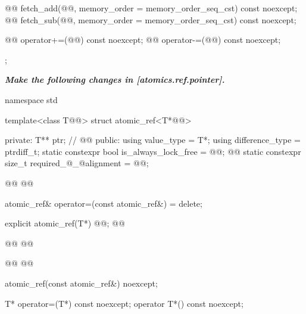 \begin{codeblock}
{{    @@ fetch_add(@@,
                             memory_order = memory_order_seq_cst) const noexcept;
    @@ fetch_sub(@@,
                             memory_order = memory_order_seq_cst) const noexcept;

    @@ operator+=(@@) const noexcept;
    @@ operator-=(@@) const noexcept;
  };
}
\end{codeblock}

\textbf{\textit{Make the following changes in [atomics.ref.pointer].}} \\

\begin{codeblock}
namespace std {
  template<class T@@> struct atomic_ref<T*@@> {
  private:
    T** ptr;              // \expos
    @@
  public:
    using value_type = T*;
    using difference_type = ptrdiff_t;
    static constexpr bool is_always_lock_free = @@;
    @@
    static constexpr size_t required_@_@alignment = @@;

    @@
    @@

    atomic_ref& operator=(const atomic_ref&) = delete;

    explicit atomic_ref(T*) @@;
    @@
   
    @@
    @@
    
    @@
    @@

    atomic_ref(const atomic_ref&) noexcept;

    T* operator=(T*) const noexcept;
    operator T*() const noexcept;

}}
\end{codeblock}
